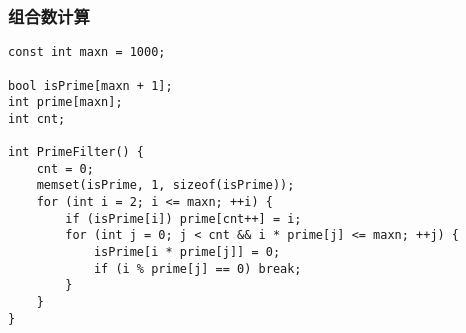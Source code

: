 \subsubsection{组合数计算}
\begin{verbatim}
const int maxn = 1000;

bool isPrime[maxn + 1];
int prime[maxn];
int cnt;

int PrimeFilter() {
    cnt = 0;
    memset(isPrime, 1, sizeof(isPrime));
    for (int i = 2; i <= maxn; ++i) {
        if (isPrime[i]) prime[cnt++] = i;
        for (int j = 0; j < cnt && i * prime[j] <= maxn; ++j) {
            isPrime[i * prime[j]] = 0;
            if (i % prime[j] == 0) break;
        }
    }
}
\end{verbatim}
